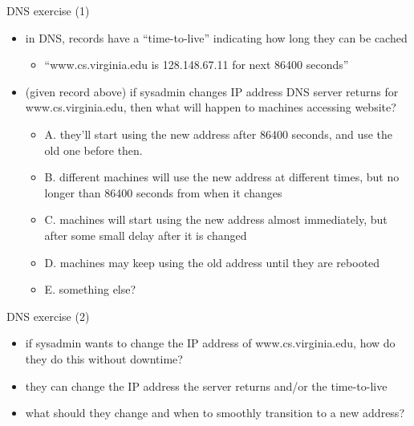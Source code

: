 \begin{frame}{DNS exercise (1)}
    \begin{itemize}
    \item in DNS, records have a ``time-to-live''
        indicating how long they can be cached
            \begin{itemize}
            \item ``www.cs.virginia.edu is 128.148.67.11 for next 86400 seconds''
            \end{itemize}
    \item (given record above)
    if sysadmin changes IP address DNS server returns for www.cs.virginia.edu,
    then what will happen to machines accessing website?
        \begin{itemize}
        \item A. they'll start using the new address after 86400 seconds, and use the old one before then.
        \item B. different machines will use the new address at different times, but no longer than 86400 seconds from when it changes
        \item C. machines will start using the new address almost immediately, but after some small delay after it is changed
        \item D. machines may keep using the old address until they are rebooted
        \item E. something else?
        \end{itemize}
    \end{itemize}
\end{frame}

\begin{frame}{DNS exercise (2)}
    \begin{itemize}
    \item if sysadmin wants to change the IP address of www.cs.virginia.edu,
            how do they do this without downtime?
    \space{.5cm}
    \item they can change the IP address the server returns and/or the time-to-live
    \item what should they change and when to smoothly transition to a new address?
    \end{itemize}
\end{frame}
